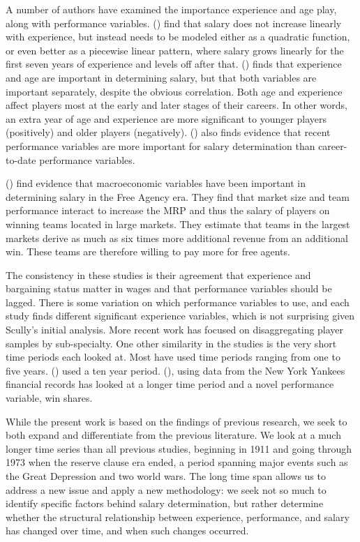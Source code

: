 \documentclass[12pt]{article}
\newcommand{\citee}[1]{\citename{#1} (\citeyear{#1})}
\begin{document}
A number of authors have examined the importance experience and age play, along with performance variables.  \citee{hv1995} find that salary does not increase linearly with experience, but instead needs to be modeled either as a quadratic function, or even better as a piecewise linear pattern, where salary grows linearly for the first seven years of experience and levels off after that. \citee{fort} finds that experience and age are important in determining salary, but that both variables are important separately, despite the obvious correlation.  Both age and experience affect players most at the early and later stages of their careers.  In other words, an extra year of age and experience are more significant to younger players (positively) and older players (negatively). \citee{fort} also finds evidence that recent performance variables are more important for salary determination than career-to-date performance variables.  

\citee{burgerwalters} find evidence that macroeconomic variables have been important in determining salary in the Free Agency era.  They find that market size and team performance interact to increase the MRP and thus the salary of players on winning teams located in large markets.  They estimate that teams in the largest markets derive as much as six times more additional revenue from an additional win.  These teams are therefore willing to pay more for free agents.  

The consistency in these studies is their agreement that experience and bargaining status matter in wages and that performance variables should be lagged.  There is some variation on which performance variables to use, and each study finds different significant experience variables, which is not surprising given Scully's initial analysis.  More recent work has focused on disaggregating player samples by sub-specialty.  One other similarity in the studies is the very short time periods each looked at.  Most have used time periods ranging from one to five years.  \citee{fort} used a ten year period.  \citee{haupert2009}, using data from the New York Yankees financial records has looked at a longer time period and a novel performance variable, win shares.  

While the present work is based on the findings of previous research, we seek to both expand and differentiate from the previous literature.  We look at a much longer time series than all previous studies, beginning in 1911 and going through 1973 when the reserve clause era ended, a period spanning major events such as the Great Depression and two world wars.  The long time span allows us to address a new issue and apply a new methodology: we seek not so much to identify specific factors behind salary determination, but rather determine whether the structural relationship between experience, performance, and salary has changed over time, and when such changes occurred. 
\end{document}
